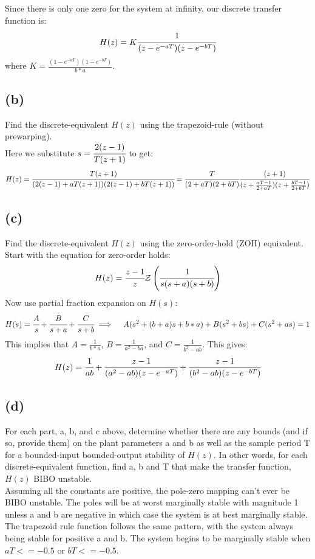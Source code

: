 \documentclass{article}
\begin{document}
Since there is only one zero for the system at infinity, our discrete transfer function is:
\[H(z)=K\cfrac{1}{(z-e^{-aT})(z-e^{-bT})}\]
where $K=\frac{(1-e^{-aT})(1-e^{-bT})}{b*a}$.


\subsection*{(b)}
Find the discrete-equivalent $H(z)$ using the trapezoid-rule (without prewarping).\\

Here we substitute $s=\cfrac{2(z-1)}{T(z+1)}$ to get:
\[H(z)=\cfrac{T(z+1)}{(2(z-1)+aT(z+1))(2(z-1)+bT(z+1))}=\cfrac{T}{(2+aT)(2+bT)}\cfrac{(z+1)}{(z+\frac{aT-1}{2+aT})(z+\frac{bT-1}{2+bT})}\]

\subsection*{(c)}
Find the discrete-equivalent $H(z)$ using the zero-order-hold (ZOH) equivalent.\\

Start with the equation for zero-order holds:
\[H(z)=\cfrac{z-1}{z}\mathcal{Z}\left (\cfrac{1}{s(s+a)(s+b)}\right )\]
Now use partial fraction expansion on $H(s)$:
\[H(s)=\cfrac{A}{s}+\cfrac{B}{s+a}+\cfrac{C}{s+b}\implies\quad A(s^2+(b+a)s+b*a)+B(s^2+bs)+C(s^2+as)=1\]
This implies that $A=\frac{1}{b*a}$, $B=\frac{1}{a^2-ba}$, and $C=\frac{1}{b^2-ab}$. This gives:
\[H(z)=\cfrac{1}{ab}+\cfrac{z-1}{(a^2-ab)(z-e^{-aT})}+\cfrac{z-1}{(b^2-ab)(z-e^{-bT})}\]

\subsection*{(d)}
For each part, a, b, and c above, determine whether there are any bounds (and if so, provide them) on the plant parameters a and b as well as the sample period T for a bounded-input bounded-output stability of $H(z)$. In other words, for each discrete-equivalent function, find a, b and T that make the transfer function, $H(z)$ BIBO unstable.\\

Assuming all the constants are positive, the pole-zero mapping can't ever be BIBO unstable. The poles will be at worst marginally stable with magnitude 1 unless a and b are negative in which case the system is at best marginally stable.\\

The trapezoid rule function follows the same pattern, with the system always being stable for positive a and b. The system begins to be marginally stable when $aT<=-0.5$ or $bT<=-0.5$.\\
\end{document}
